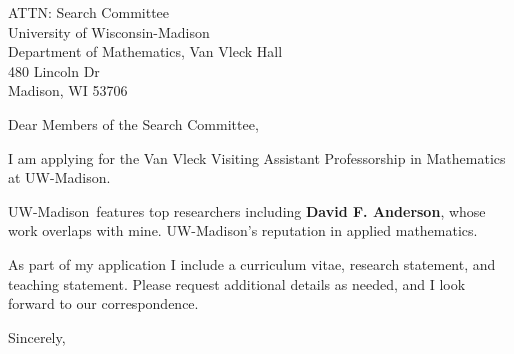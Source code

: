 \documentclass[11pt,a4paper]{letter}
\begin{document}

\def\School{UW-Madison}
\begin{letter}
{ATTN: Search Committee\\
University of Wisconsin-Madison\\
Department of Mathematics, Van Vleck Hall\\
480 Lincoln Dr\\
Madison, WI 53706
}


\opening{Dear Members of the Search Committee,}

I am applying for the Van Vleck Visiting Assistant Professorship in Mathematics at \School. 



\School~features top researchers including \textbf{David F. Anderson}, whose work overlaps with mine. \School's reputation in applied mathematics.



As part of my application I include a curriculum vitae, research statement, and teaching statement. Please request additional details as needed, and I look forward to our correspondence.

\closing{Sincerely,}
\end{letter}
\end{document}

